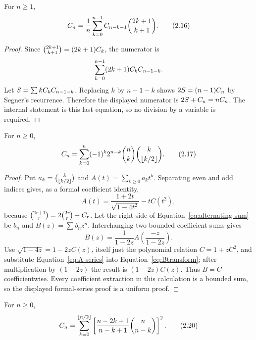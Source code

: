 \begin{theorem}
For $n\ge1$,
\[
 C_n=\frac1n\sum_{k=0}^{n-1}
 C_{n-k-1}\binom{2k+1}{k+1}.                                 \tag{2.16}\label{eq:weighted-sum}
\]
\end{theorem}

\begin{proof}
Since $\binom{2k+1}{k+1}=(2k+1)C_k$, the numerator is
\[
 \sum_{k=0}^{n-1}(2k+1)C_kC_{n-1-k}.
\]
Let $S=\sum kC_kC_{n-1-k}$.  Replacing $k$ by $n-1-k$ shows
$2S=(n-1)C_n$ by Segner's recurrence.  Therefore the displayed numerator
is $2S+C_n=nC_n$.  The internal statement is this last equation, so no
division by a variable is required.
\end{proof}

\begin{theorem}
For $n\ge0$,
\[
 C_n=\sum_{k=0}^{n}(-1)^k2^{n-k}\binom nk
               \binom{k}{\left\lfloor k/2\right\rfloor}.                           \tag{2.17}\label{eq:alternating-sum}
\]
\end{theorem}

\begin{proof}
Put $a_k=\binom{k}{\left\lfloor k/2\right\rfloor}$ and
$A(t)=\sum_{k\ge0}a_kt^k$.  Separating even and odd indices gives, as a formal
coefficient identity,
\[
 A(t)=\frac{1+2t}{\sqrt{1-4t^2}}-tC(t^2),                        \tag{2.18}\label{eq:A-series}
\]
because
$\binom{2r+1}{r}=2\binom{2r}{r}-C_r$.  Let the right side of
Equation~\eqref{eq:alternating-sum} be $b_n$ and
$B(z)=\sum b_nz^n$.  Interchanging two bounded coefficient sums gives
\[
 B(z)=\frac1{1-2z}A\left(\frac{-z}{1-2z}\right).                 \tag{2.19}\label{eq:Btransform}
\]
Use $\sqrt{1-4z}=1-2zC(z)$, itself just the polynomial relation
$C=1+zC^2$, and substitute Equation~\eqref{eq:A-series} into
Equation~\eqref{eq:Btransform}; after multiplication by $(1-2z)$ the result is
$(1-2z)C(z)$.  Thus $B=C$ coefficientwise.  Every coefficient extraction in
this calculation is a bounded sum, so the displayed formal-series proof is a
uniform \ipra{} proof.
\end{proof}

\begin{theorem}
For $n\ge0$,
\[
 C_n=\sum_{k=0}^{\left\lfloor n/2\right\rfloor}
 \left[\frac{n-2k+1}{n-k+1}\binom n{n-k}\right]^2.              \tag{2.20}\label{eq:square-sum}
\]
\end{theorem}


